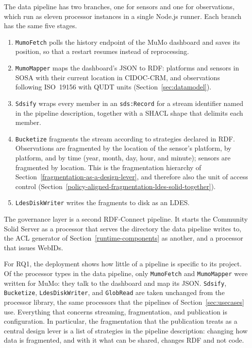 The data pipeline has two branches, one for sensors and one for observations,
which run as eleven processor instances in a single Node.js runner.
Each branch has the same five stages.
\begin{enumerate}
    \item \texttt{MumoFetch} polls the history endpoint of the MuMo dashboard
        and saves its position, so that a restart resumes instead of reprocessing.
    \item \texttt{MumoMapper} maps the dashboard's JSON to RDF:
        platforms and sensors in SOSA with their current location in CIDOC-CRM,
        and observations following ISO~19156 with QUDT units (Section~\ref{sec:datamodel}).
    \item \texttt{Sdsify} wraps every member in an \texttt{sds:Record}
        for a stream identifier named in the pipeline description,
        together with a SHACL shape that delimits each member.
    \item \texttt{Bucketize} fragments the stream according to strategies declared in RDF.
        Observations are fragmented by the location of the sensor's platform, by platform,
        and by time (year, month, day, hour, and minute);
        sensors are fragmented by location.
        This is the fragmentation hierarchy of Section~\ref{fragmentation-as-a-design-lever},
        and therefore also the unit of access control
        (Section~\ref{policy-aligned-fragmentation-ldes-solid-together}).
    \item \texttt{LdesDiskWriter} writes the fragments to disk as an LDES.
\end{enumerate}
The governance layer is a second RDF-Connect pipeline.
It starts the Community Solid Server as a processor that serves the directory the data pipeline writes to,
the ACL generator of Section~\ref{runtime-components} as another,
and a processor that issues WebIDs.

For RQ1, the deployment shows how little of a pipeline is specific to its project.
Of the processor types in the data pipeline,
only \texttt{MumoFetch} and \texttt{MumoMapper} were written for MuMo:
they talk to the dashboard and map its JSON.
\texttt{Sdsify}, \texttt{Bucketize}, \texttt{LdesDiskWriter}, and \texttt{GlobRead}
are taken unchanged from the processor library,
the same processors that the pipelines of Section~\ref{sec:usecases} use.
Everything that concerns streaming, fragmentation, and publication is configuration.
In particular, the fragmentation that the publication treats as a central design lever
is a list of strategies in the pipeline description:
changing how data is fragmented, and with it what can be shared,
changes RDF and not code.

